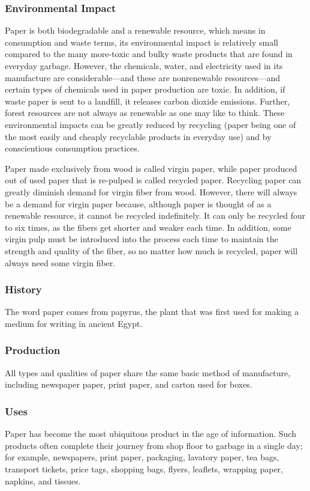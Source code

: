 \documentclass[12pt]{article}
\begin{document}
%
\subsubsection{Environmental Impact}
Paper is both biodegradable and a renewable resource, which means in consumption and waste terms, its environmental impact is relatively small compared to the many more-toxic and bulky waste products that are found in everyday garbage. However, the chemicals, water, and electricity used in its manufacture are considerable---and these are nonrenewable resources---and certain types of chemicals used in paper production are toxic. In addition, if waste paper is sent to a landfill, it releases carbon dioxide emissions. Further, forest resources are not always as renewable as one may like to think. These environmental impacts can be greatly reduced by recycling (paper being one of the most easily and cheaply recyclable products in everyday use) and by conscientious consumption practices.

Paper made exclusively from wood is called virgin paper, while paper produced out of used paper that is re-pulped is called recycled paper. Recycling paper can greatly diminish demand for virgin fiber from wood. However, there will always be a demand for virgin paper because, although paper is thought of as a renewable resource, it cannot be recycled indefinitely. It can only be recycled four to six times, as the fibers get shorter and weaker each time. In addition, some virgin pulp must be introduced into the process each time to maintain the strength and quality of the fiber, so no matter how much is recycled, paper will always need some virgin fiber.

%
\subsubsection{History}
The word paper comes from papyrus, the plant that was first used for making a medium for writing in ancient Egypt.

%
\subsubsection{Production}
All types and qualities of paper share the same basic method of manufacture, including newspaper paper, print paper, and carton used for boxes.

%
\subsubsection{Uses}
Paper has become the most ubiquitous product in the age of information. Such products often complete their journey from shop floor to garbage in a single day; for example, newspapers, print paper, packaging, lavatory paper, tea bags, transport tickets, price tags, shopping bags, flyers, leaflets, wrapping paper, napkins, and tissues. 
\end{document}
